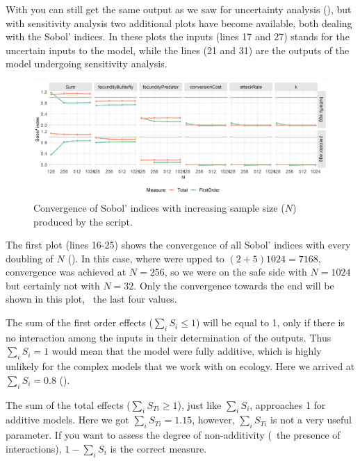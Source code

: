 With  you can still get the same output as we saw for uncertainty analysis (), but with sensitivity analysis two additional plots have become available, both dealing with the Sobol' indices. In these plots the  inputs (lines 17 and 27) stands for the uncertain inputs to the model, while the  lines (21 and 31) are the outputs of the model undergoing sensitivity analysis.

\begin{figure} 
\centering
\includegraphics[width=\textwidth]{graphics/sensitivity-analysis-pred-prey-2}
\caption{Convergence of Sobol' indices with increasing sample size ($N$) produced by the  script.}
\label{fig:sensitivity-analysis-pred-prey-2}
\end{figure}

The first plot (lines 16-25) shows the convergence of all Sobol' indices with every doubling of $N$ (). In this case, where  were upped to $(2+5)1024=7168$, convergence was achieved at $N=256$, so we were on the safe side with $N=1024$ but certainly not with $N=32$. Only the convergence towards the end will be shown in this plot, \ie\ the last four values.

The sum of the first order effects ($\sum_i S_i \leq 1$) will be equal to 1, only if there is no interaction among the inputs in their determination of the outputs. Thus $\sum_i S_i=1$ would mean that the model were fully additive, which is highly unlikely for the complex models that we work with on ecology. Here we arrived at $\sum_i S_i=0.8$ (). 

The sum of the total effects ($\sum_i S_{Ti} \geq 1$), just like $\sum_i S_{i}$, approaches 1 for additive models. Here we got $\sum_i S_{Ti}=1.15$, however, $\sum_i S_{Ti}$ is not a very useful parameter. If you want to assess the degree of non-additivity (\ie\ the presence of interactions), $1-\sum_i S_i$ is the correct measure.

